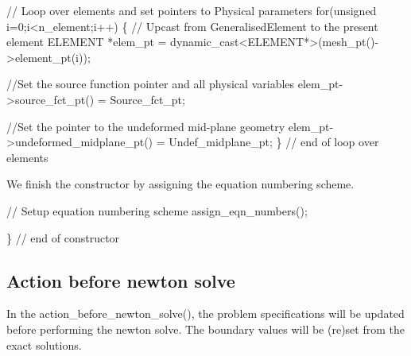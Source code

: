 \begin{DoxyCodeInclude}
 \textcolor{comment}{// Loop over elements and set pointers to Physical parameters}
 \textcolor{keywordflow}{for}(\textcolor{keywordtype}{unsigned} i=0;i<n\_element;i++)
  \{
   \textcolor{comment}{// Upcast from GeneralisedElement to the present element}
   ELEMENT *elem\_pt = \textcolor{keyword}{dynamic\_cast<}ELEMENT*\textcolor{keyword}{>}(mesh\_pt()->element\_pt(i));
   
   \textcolor{comment}{//Set the source function pointer and all physical variables}
   elem\_pt->source\_fct\_pt() = Source\_fct\_pt;
   
   \textcolor{comment}{//Set the pointer to the undeformed mid-plane geometry}
   elem\_pt->undeformed\_midplane\_pt() = Undef\_midplane\_pt;
  \} \textcolor{comment}{// end of loop over elements}

\end{DoxyCodeInclude}


We finish the constructor by assigning the equation numbering scheme. 
\begin{DoxyCodeInclude}
 \textcolor{comment}{// Setup equation numbering scheme}
 assign\_eqn\_numbers();

\} \textcolor{comment}{// end of constructor}

\end{DoxyCodeInclude}




\hypertarget{index_actionbefore}{}\subsection{Action before newton solve}\label{index_actionbefore}
In the {\ttfamily action\+\_\+before\+\_\+newton\+\_\+solve()}, the problem specifications will be updated before performing the newton solve. The boundary values will be (re)set from the exact solutions.

